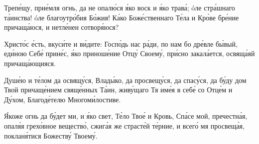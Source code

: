 \begin{mymulticols}
 Треп\'{е}щу, при\'{е}мля огнь, да не опал\'{ю}ся \'{я}ко воск и \'{я}ко трав\'{а}; \'{o}ле стр\'{а}шнаго т\'{а}инства! \'{o}ле благоутр\'{о}бия Б\'{о}жия! К\'{а}ко Бож\'{е}ственнаго Т\'{е}ла и Кр\'{о}ве бр\'{е}ние причащ\'{а}юся, и нетл\'{е}нен сотвор\'{я}юся?




Христ\'{о}с \'{е}сть, вкус\'{и}те и в\'{и}дите: Госп\'{о}дь нас р\'{а}ди, по нам бо др\'{е}вле б\'{ы}вый, ед\'{и}ною Себ\'{е} прин\'{е}с, \'{я}ко принош\'{е}ние Отц\'{у} Своем\'{у}, пр\'{и}сно закал\'{а}ется, освящ\'{а}яй причащ\'{а}ющияся.


Душ\'{е}ю и т\'{е}лом да освящ\'{у}ся, Влад\'{ы}ко, да просвещ\'{у}ся, да спас\'{у}ся, да б\'{у}ду дом Твой причащ\'{е}нием свящ\'{е}нных Т\'{а}ин, жив\'{у}щаго Тя им\'{е}я в себ\'{е} со Отц\'{е}м и Д\'{у}хом, Благод\'{е}телю Многом\'{и}лостиве.


\'{Я}коже огнь да б\'{у}дет ми, и \'{я}ко свет, Т\'{е}ло Тво\'{е} и Кровь, Сп\'{а}се мой, пречестн\'{а}я, опал\'{я}я грех\'{о}вное веществ\'{о}, сжиг\'{а}я же страст\'{е}й т\'{е}рние, и всег\'{о} мя просвещ\'{а}я, поклан\'{я}тися Божеств\'{у} Твоем\'{у}.




\Chestneyshuyu

\TrisviatoePoOtcheNash



\end{mymulticols}
